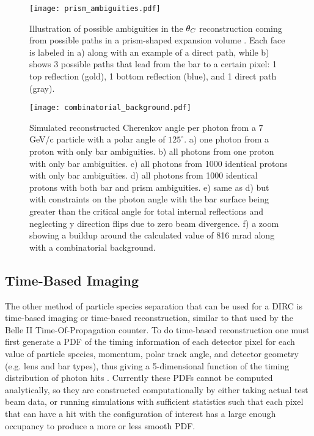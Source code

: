 \begin{figure}[!htb]
	\centering
	\texttt{[image: prism\_ambiguities.pdf]}
	\caption[Illustration of possible ambiguities in the $\thetaC$ reconstruction coming from possible paths in a prism-shaped expansion volume.]{Illustration of possible ambiguities in the $\thetaC$ reconstruction coming from possible paths in a prism-shaped expansion volume \cite{GregThesis}. Each face is labeled in a) along with an example of a direct path, while b) shows 3 possible paths that lead from the bar to a certain pixel: 1 top reflection (gold), 1 bottom reflection (blue), and 1 direct path (gray).}
	\label{fig:prism_ambiguities}
\end{figure}

\begin{figure}[!htb]
	\centering
	\texttt{[image: combinatorial\_background.pdf]}
	\caption[Simulated reconstructed Cherenkov angle per photon from a 7 GeV/c particle with a polar angle of $125^{\circ}$.]{Simulated reconstructed Cherenkov angle per photon from a 7 GeV/c particle with a polar angle of $125^{\circ}$. a) one photon from a proton with only bar ambiguities. b) all photons from one proton with only bar ambiguities. c) all photons from 1000 identical protons with only bar ambiguities. d) all photons from 1000 identical protons with both bar and prism ambiguities. e) same as d) but with constraints on the photon angle with the bar surface being greater than the critical angle for total internal reflections and neglecting y direction flips due to zero beam divergence. f) a zoom showing a buildup around the calculated value of 816 mrad along with a combinatorial background.}
	\label{fig:combinatorial_background}
\end{figure}

\subsection{Time-Based Imaging}
The other method of particle species separation that can be used for a DIRC is time-based imaging or time-based reconstruction, similar to that used by the Belle II Time-Of-Propagation counter. To do time-based reconstruction one must first generate a PDF of the timing information of each detector pixel for each value of particle species, momentum, polar track angle, and detector geometry (e.g. lens and bar types), thus giving a 5-dimensional function  of the timing distribution of photon hits \cite{PANDA_barrel}. Currently these PDFs cannot be computed analytically, so they are constructed computationally by either taking actual test beam data, or running simulations with sufficient statistics such that each pixel that can have a hit with the configuration of interest has a large enough occupancy to produce a more or less smooth PDF.


